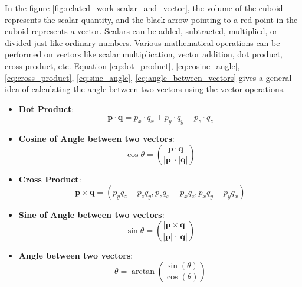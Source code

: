 In the figure \ref{fig:related_work-scalar_and_vector}, the volume of the cuboid represents the scalar quantity, and the black arrow pointing to a red point in the cuboid represents a vector. Scalars can be added, subtracted, multiplied, or divided just like ordinary numbers. Various mathematical operations can be performed on vectors like scalar multiplication, vector addition, dot product, cross product, etc. Equation \ref{eq:dot_product}, \ref{eq:cosine_angle}, \ref{eq:cross_product}, \ref{eq:sine_angle}, \ref{eq:angle_between_vectors} gives a general idea of calculating the angle between two vectors using the vector operations.
\begin{itemize}
    \item \textbf{Dot Product}:
    \begin{equation}\label{eq:dot_product}
        \mathbf{p} \cdot \mathbf{q} = p_x \cdot q_x + p_y \cdot q_y + p_z \cdot q_z
    \end{equation}
    \item \textbf{Cosine of Angle between two vectors}:
    \begin{equation}\label{eq:cosine_angle}
        \cos\theta = \left(\frac{\mathbf{p} \cdot \mathbf{q}}{|\mathbf{p}| \cdot |\mathbf{q}|}\right)
    \end{equation}
    \item \textbf{Cross Product}:
    \begin{equation}\label{eq:cross_product}
        \mathbf{p} \times \mathbf{q} = (p_y q_z - p_z q_y, p_z q_x - p_x q_z, p_x q_y - p_y q_x)
    \end{equation}
    \item \textbf{Sine of Angle between two vectors}:
    \begin{equation}\label{eq:sine_angle}
        \sin\theta = \left(\frac{|\mathbf{p} \times \mathbf{q}|}{|\mathbf{p}| \cdot |\mathbf{q}|}\right)
    \end{equation}
    \item \textbf{Angle between two vectors}:
    \begin{equation}\label{eq:angle_between_vectors}
        \theta = \arctan\left(\frac{\sin(\theta)}{\cos(\theta)}\right)
    \end{equation}
\end{itemize}

